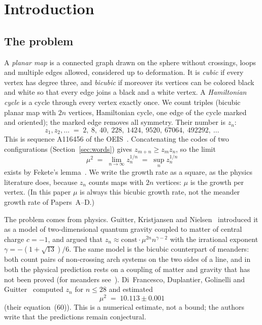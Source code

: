 \section{Introduction}\label{sec:intro}

\subsection{The problem}

A \emph{planar map} is a connected graph drawn on the sphere without crossings, loops and multiple edges allowed,
considered up to deformation. It is \emph{cubic} if every vertex has degree three, and \emph{bicubic} if moreover its
vertices can be colored black and white so that every edge joins a black and a white vertex. A \emph{Hamiltonian
cycle} is a cycle through every vertex exactly once. We count triples (bicubic planar map with $2n$ vertices,
Hamiltonian cycle, one edge of the cycle marked and oriented); the marked edge removes all symmetry. Their number is
$z_n$:
\[ z_1,z_2,\ldots \;=\; 2,\ 8,\ 40,\ 228,\ 1424,\ 9520,\ 67064,\ 492292,\ \ldots \]
This is sequence A116456 of the OEIS~\cite{OEISbicubic}. Concatenating the codes of two configurations
(Section~\ref{sec:words}) gives $z_{m+n}\ge z_mz_n$, so the limit
\[ \mu^2 \;=\; \lim_{n\to\infty} z_n^{1/n} \;=\; \sup_n z_n^{1/n} \]
exists by Fekete's lemma~\cite{Fekete}. We write the growth rate as a square, as the physics literature does,
because $z_n$ counts maps with $2n$ vertices: $\mu$ is the growth per vertex. (In this paper $\mu$ is always this
bicubic growth rate, not the meander growth rate of Papers~A--D.)

The problem comes from physics. Guitter, Kristjansen and Nielsen~\cite{GKN} introduced it as a model of
two-dimensional quantum gravity coupled to matter of central charge $c=-1$, and argued that
$z_n\approx\mathrm{const}\cdot\mu^{2n}n^{\gamma-2}$ with the irrational exponent $\gamma=-(1+\sqrt{13})/6$. The same
model is the bicubic counterpart of meanders: both count pairs of non-crossing arch systems on the two sides of a line,
and in both the physical prediction rests on a coupling of matter and gravity that has not been proved
(for meanders see~\cite{PaperA}). Di~Francesco,
Duplantier, Golinelli and Guitter~\cite{DDGG} computed $z_n$ for $n\le 28$ and estimated
\[ \mu^2 \;=\; 10.113\pm0.001 \]
(their equation~(60)). This is a numerical estimate, not a bound; the authors write that the predictions remain
conjectural.

